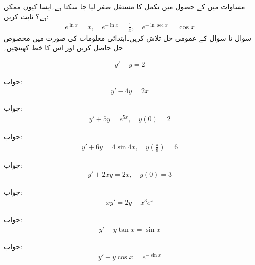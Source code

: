مساوات  میں  کے حصول میں تکمل کا مستقل صفر لیا جا سکتا ہے۔ایسا کیوں ممکن ہے؟
ثابت کریں:
\begin{align*}
e^{\ln x}=x, \quad  e^{-\ln x}=\frac{1}{x}, \quad e^{-\ln \sec x}=\cos x
\end{align*}
سوال  تا سوال  کے عمومی حل تلاش کریں۔ابتدائی معلومات کی صورت میں مخصوص حل حاصل کریں اور اس کا خط کھینچیں۔

\begin{align*}
y'-y=2
\end{align*}

جواب:
\begin{align*}
y'-4y=2x
\end{align*}

جواب:
\begin{align*}
y'+5y=e^{5x}, \quad y(0)=2
\end{align*}

جواب:
\begin{align*}
y'+6y=4\sin 4x,\quad y\left(\frac{\pi}{8}\right)=6 
\end{align*}

جواب:
\begin{align*}
y'+2xy=2x,\quad y(0)=3
\end{align*}

جواب:
\begin{align*}
xy'=2y+x^3e^x
\end{align*}

جواب:
\begin{align*}
y'+y\tan x=\sin x
\end{align*}

جواب:
\begin{align*}
y'+y\cos x=e^{-\sin x}
\end{align*}

